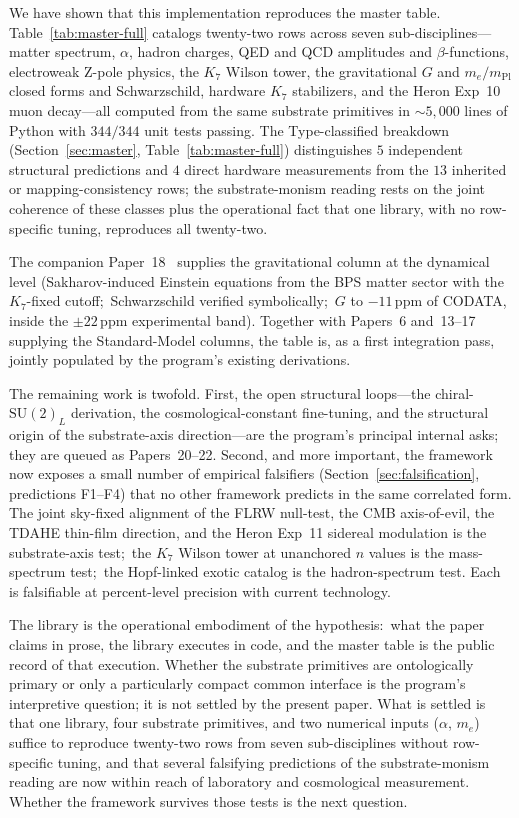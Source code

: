 \documentclass[11pt]{article}
\newcommand{\mPl}{m_{\mathrm{Pl}}}
\newcommand{\me}{m_e}
\newcommand{\SU}{\mathrm{SU}}
\begin{document}
We have shown that this implementation reproduces the master
table.  Table~\ref{tab:master-full} catalogs twenty-two rows
across seven sub-disciplines---matter spectrum, $\alpha$, hadron
charges, QED and QCD amplitudes and $\beta$-functions,
electroweak Z-pole physics, the $K_7$ Wilson tower, the
gravitational $G$ and $\me/\mPl$ closed forms and Schwarzschild,
hardware $K_7$ stabilizers, and the Heron Exp~10 muon decay---all
computed from the same substrate primitives in
$\sim 5{,}000$ lines of Python with $344/344$ unit tests
passing.  The Type-classified breakdown
(Section~\ref{sec:master}, Table~\ref{tab:master-full})
distinguishes $5$ independent structural predictions and $4$
direct hardware measurements from the $13$ inherited or
mapping-consistency rows; the substrate-monism reading rests on
the joint coherence of these classes plus the operational fact
that one library, with no row-specific tuning, reproduces all
twenty-two.

The companion Paper~18~\cite{paper18} supplies the gravitational
column at the dynamical level (Sakharov-induced Einstein
equations from the BPS matter sector with the $K_7$-fixed
cutoff;\ Schwarzschild verified symbolically;\ $G$ to
$-11$\,ppm of CODATA, inside the $\pm 22$\,ppm experimental
band).  Together with Papers~6 and~13--17 supplying the
Standard-Model columns, the table is, as a first integration
pass, jointly populated by the program's existing derivations.

The remaining work is twofold.  First, the open structural
loops---the chiral-$\SU(2)_L$ derivation, the
cosmological-constant fine-tuning, and the structural origin of
the substrate-axis direction---are the program's principal
internal asks; they are queued as Papers~20--22.  Second, and
more important, the framework now exposes a small number of
empirical falsifiers
(Section~\ref{sec:falsification}, predictions F1--F4) that no
other framework predicts in the same correlated form.  The
joint sky-fixed alignment of the FLRW null-test, the CMB
axis-of-evil, the TDAHE thin-film direction, and the Heron
Exp~11 sidereal modulation is the substrate-axis test;\ the
$K_7$ Wilson tower at unanchored $n$ values is the
mass-spectrum test;\ the Hopf-linked exotic catalog is the
hadron-spectrum test.  Each is falsifiable at percent-level
precision with current technology.

The library is the operational embodiment of the
hypothesis:\ what the paper claims in prose, the library
executes in code, and the master table is the public record of
that execution.  Whether the substrate primitives are
ontologically primary or only a particularly compact common
interface is the program's interpretive question; it is not
settled by the present paper.  What is settled is that one
library, four substrate primitives, and two numerical inputs
($\alpha$, $\me$) suffice to reproduce twenty-two rows from
seven sub-disciplines without row-specific tuning, and that
several falsifying predictions of the substrate-monism reading
are now within reach of laboratory and cosmological
measurement.  Whether the framework survives those tests is the
next question.
\end{document}
